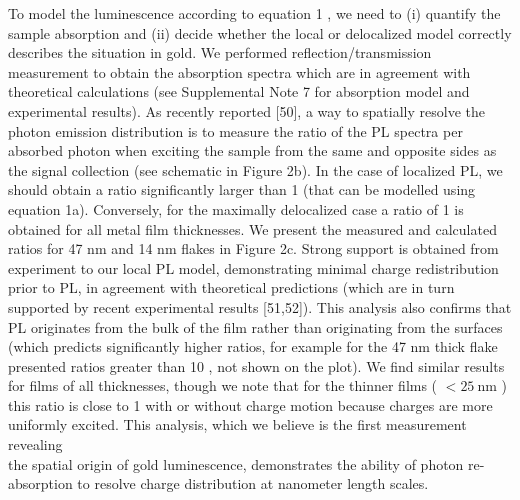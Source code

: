 \documentclass[10pt]{article}
\begin{document}
To model the luminescence according to equation 1 , we need to (i) quantify the sample absorption and (ii) decide whether the local or delocalized model correctly describes the situation in gold. We performed reflection/transmission measurement to obtain the absorption spectra which are in agreement with theoretical calculations (see Supplemental Note 7 for absorption model and experimental results). As recently reported [50], a way to spatially resolve the photon emission distribution is to measure the ratio of the PL spectra per absorbed photon when exciting the sample from the same and opposite sides as the signal collection (see schematic in Figure 2b). In the case of localized PL, we should obtain a ratio significantly larger than 1 (that can be modelled using equation 1a). Conversely, for the maximally delocalized case a ratio of 1 is obtained for all metal film thicknesses. We present the measured and calculated ratios for 47 nm and 14 nm flakes in Figure 2c. Strong support is obtained from experiment to our local PL model, demonstrating minimal charge redistribution prior to PL, in agreement with theoretical predictions (which are in turn supported by recent experimental results [51,52]). This analysis also confirms that PL originates from the bulk of the film rather than originating from the surfaces (which predicts significantly higher ratios, for example for the 47 nm thick flake presented ratios greater than 10 , not shown on the plot). We find similar results for films of all thicknesses, though we note that for the thinner films ( $<25 \mathrm{~nm}$ ) this ratio is close to 1 with or without charge motion because charges are more uniformly excited. This analysis, which we believe is the first measurement revealing\\
the spatial origin of gold luminescence, demonstrates the ability of photon re-absorption to resolve charge distribution at nanometer length scales.
\end{document}
